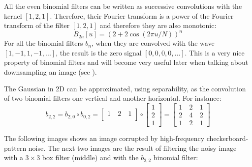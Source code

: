 All the even binomial filters can be written as successive convolutions with the kernel $\left[1,2,1\right]$. Therefore, their Fourier transform is a power of the Fourier transform of the filter $\left[1,2,1\right]$ and therefore they are also monotonic:
\begin{equation}
B_{2n} \left[u\right] = (2+2 \cos (2 \pi u/N))^n
\end{equation}
For all the binomial filters $b_n$, when they are convolved with the wave $\left[1,-1,1,-1,...\right]$, the result is the zero signal $\left[0,0,0,0,...\right]$. This is a very nice property of binomial filters and will become very useful later when talking about downsampling an image (see \chap{\ref{chap:downsampling_and_upsampling}}). 


The Gaussian in 2D can be approximated, using separability, as the convolution of two binomial filters one vertical and another horizontal. For instance:
\begin{equation}
b_{2,2} = b_{2,0} \circ b_{0,2} =  \begin{bmatrix}
  1 ~& 2 ~& 1 \\
\end{bmatrix}\circ \begin{bmatrix}
  1 \\
  2 \\
  1
\end{bmatrix}=
% 
\begin{bmatrix}
  1 ~& 2 ~& 1 \\
  2 ~& 4 ~& 2\\
  1~& 2 ~& 1
\end{bmatrix}
\end{equation}


The following images shows an image corrupted by high-frequency checkerboard-pattern noise. The next two images are the result of filtering the noisy image with a $3\times3$ box filter (middle) and with the $b_{2,2}$ binomial filter:

